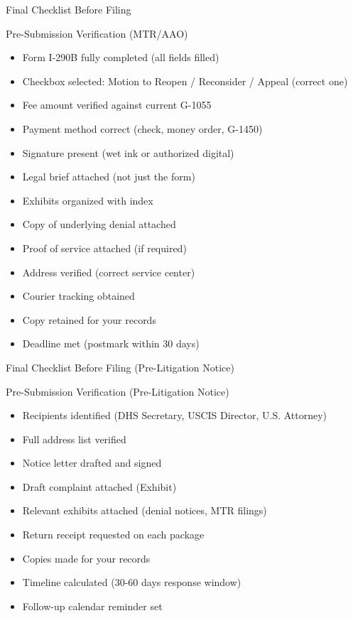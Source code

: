 \documentclass[11pt]{beamer}
\begin{document}
	\begin{frame}{Final Checklist Before Filing}
		\scriptsize
		\begin{block}{Pre-Submission Verification (MTR/AAO)}
			\begin{itemize}
				\item [$\square$] Form I-290B fully completed (all fields filled)
				\item [$\square$] Checkbox selected: Motion to Reopen / Reconsider / Appeal (correct one)
				\item [$\square$] Fee amount verified against current G-1055
				\item [$\square$] Payment method correct (check, money order, G-1450)
				\item [$\square$] Signature present (wet ink or authorized digital)
				\item [$\square$] Legal brief attached (not just the form)
				\item [$\square$] Exhibits organized with index
				\item [$\square$] Copy of underlying denial attached
				\item [$\square$] Proof of service attached (if required)
				\item [$\square$] Address verified (correct service center)
				\item [$\square$] Courier tracking obtained
				\item [$\square$] Copy retained for your records
				\item [$\square$] Deadline met (postmark within 30 days)
			\end{itemize}
		\end{block}
	\end{frame}
	
	\begin{frame}{Final Checklist Before Filing (Pre-Litigation Notice)}
		\scriptsize
		\begin{block}{Pre-Submission Verification (Pre-Litigation Notice)}
			\begin{itemize}
				\item [$\square$] Recipients identified (DHS Secretary, USCIS Director, U.S. Attorney)
				\item [$\square$] Full address list verified
				\item [$\square$] Notice letter drafted and signed
				\item [$\square$] Draft complaint attached (Exhibit)
				\item [$\square$] Relevant exhibits attached (denial notices, MTR filings)
				\item [$\square$] Return receipt requested on each package
				\item [$\square$] Copies made for your records
				\item [$\square$] Timeline calculated (30-60 days response window)
				\item [$\square$] Follow-up calendar reminder set
			\end{itemize}
		\end{block}
	\end{frame}
	
\end{document}
